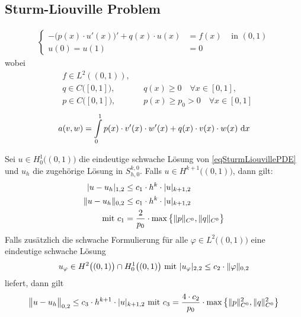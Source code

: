 \subsection*{Sturm-Liouville Problem}
\begin{align}\label{eqSturmLiouvillePDE}\tag{SturmLiouville}
	\left\lbrace\begin{array}{rll}
		-\big(p(x)\cdot u'(x)\big)'+q(x)\cdot u(x) &= f(x) &\text{ in } (0,1)\\
		u(0)=u(1)&=0 &
	\end{array}
	\right.
\end{align}
wobei
\begin{align*}
	&f\in L^2((0,1)),\\
	&q\in C\big([0,1]\big), &&q(x)\geq0\quad\forall x\in[0,1], \\
	&p\in C\big([0,1]\big), &&p(x)\geq p_0>0\quad\forall x\in [0,1]
\end{align*}
\begin{align*}
	a(v,w)=\int\limits_0^1 p(x)\cdot v'(x)\cdot w'(x)+q(x)\cdot v(x)\cdot w(x)\d x
\end{align*}

\begin{theorem}\label{theorem4.4}
	Sei $u\in H^1_0\big((0,1)\big)$ die eindeutige schwache Lösung von \eqref{eqSturmLiouvillePDE} und $u_h$ die zugehörige Lösung in $S_{h,0}^{k,0}$.
	Falls $u\in H^{k+1}\big((0,1)\big)$, dann gilt:
	\begin{align*}
		|u-u_h|_{1,2}&\leq c_1\cdot h^k\cdot |u|_{k+1,2}\\
		\Vert u-u_h\Vert_{0,2}&\leq c_1\cdot h^k\cdot |u|_{k+1,2}\\
		\mit c_1&=\frac{2}{p_0}\cdot\max\limits\big\lbrace \Vert p\Vert_{C^0},\Vert q\Vert_{C^0}\big\rbrace
	\end{align*}
	Falls zusätzlich die schwache Formulierung für alle $\varphi\in L^2\big((0,1)\big)$ eine eindeutige schwache Lösung 
	\begin{align*}
		u_\varphi\in H^2\big((0,1)\big)\cap H^1_0\big((0,1)\big)\mit |u_\varphi|_{2,2}\leq c_2\cdot\Vert \varphi\Vert_{0,2}
	\end{align*}
	liefert, dann gilt
	\begin{align*}
		\big\Vert u-u_h\big\Vert_{0,2}\leq c_3\cdot h^{k+1}\cdot |u|_{k+1,2}
		\mit c_3=\frac{4\cdot c_2}{p_0}\cdot\max\limits\left\lbrace\Vert p\Vert^2_{C^0},\Vert q\Vert^2_{C^0}\right\rbrace
	\end{align*}
\end{theorem}

